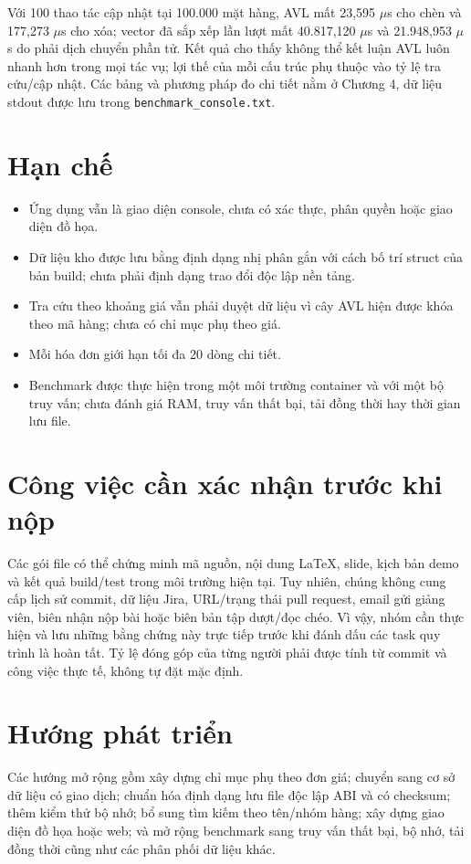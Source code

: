 Với 100 thao tác cập nhật tại 100.000 mặt hàng, AVL mất 23,595 $\mu$s cho chèn và 177,273 $\mu$s cho xóa; vector đã sắp xếp lần lượt mất 40.817,120 $\mu$s và 21.948,953 $\mu$s do phải dịch chuyển phần tử. Kết quả cho thấy không thể kết luận AVL luôn nhanh hơn trong mọi tác vụ; lợi thế của mỗi cấu trúc phụ thuộc vào tỷ lệ tra cứu/cập nhật. Các bảng và phương pháp đo chi tiết nằm ở Chương 4, dữ liệu stdout được lưu trong \texttt{benchmark\_console.txt}.

\section*{Hạn chế}
\begin{itemize}
  \item Ứng dụng vẫn là giao diện console, chưa có xác thực, phân quyền hoặc giao diện đồ họa.
  \item Dữ liệu kho được lưu bằng định dạng nhị phân gắn với cách bố trí struct của bản build; chưa phải định dạng trao đổi độc lập nền tảng.
  \item Tra cứu theo khoảng giá vẫn phải duyệt dữ liệu vì cây AVL hiện được khóa theo mã hàng; chưa có chỉ mục phụ theo giá.
  \item Mỗi hóa đơn giới hạn tối đa 20 dòng chi tiết.
  \item Benchmark được thực hiện trong một môi trường container và với một bộ truy vấn; chưa đánh giá RAM, truy vấn thất bại, tải đồng thời hay thời gian lưu file.
\end{itemize}

\section*{Công việc cần xác nhận trước khi nộp}
Các gói file có thể chứng minh mã nguồn, nội dung LaTeX, slide, kịch bản demo và kết quả build/test trong môi trường hiện tại. Tuy nhiên, chúng không cung cấp lịch sử commit, dữ liệu Jira, URL/trạng thái pull request, email gửi giảng viên, biên nhận nộp bài hoặc biên bản tập dượt/đọc chéo. Vì vậy, nhóm cần thực hiện và lưu những bằng chứng này trực tiếp trước khi đánh dấu các task quy trình là hoàn tất. Tỷ lệ đóng góp của từng người phải được tính từ commit và công việc thực tế, không tự đặt mặc định.

\section*{Hướng phát triển}
Các hướng mở rộng gồm xây dựng chỉ mục phụ theo đơn giá; chuyển sang cơ sở dữ liệu có giao dịch; chuẩn hóa định dạng lưu file độc lập ABI và có checksum; thêm kiểm thử bộ nhớ; bổ sung tìm kiếm theo tên/nhóm hàng; xây dựng giao diện đồ họa hoặc web; và mở rộng benchmark sang truy vấn thất bại, bộ nhớ, tải đồng thời cũng như các phân phối dữ liệu khác.
